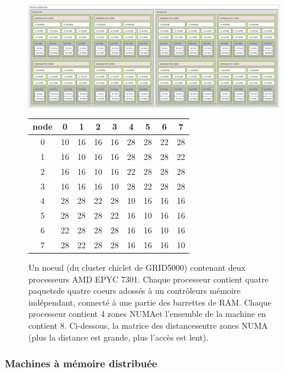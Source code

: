 \begin{figure}
  \centering
  \includegraphics[width=\textwidth]{lstopo_chiclet}
  \caption{Un noeud (du cluster chiclet de GRID5000) contenant deux processeurs
    AMD EPYC 7301. Chaque processeur contient quatre \og paquets\fg de quatre
    coeurs adossés à un contrôleurs mémoire indépendant, connecté à une partie
    des barrettes de RAM. Chaque processeur contient 4 \og zones NUMA\fg et
    l'ensemble de la machine en contient 8. Ci-dessous, la matrice des \og
    distances\fg entre zones NUMA (plus la distance est grande, plus l'accès est
    lent). \label{fig:chiclet}}

\medskip
  
\begin{tabular}{|c||c|c|c|c|c|c|c|c|}  
  \hline
  node &  0 &  1 &  2 &  3 &  4 &  5 &  6 &  7 \\
  \hline\hline
  0 &  10 & 16 & 16 & 16 & 28 & 28 & 22 & 28 \\
  \hline
  1 &  16 & 10 & 16 & 16 & 28 & 28 & 28 & 22 \\
    \hline
  2 &  16 & 16 & 10 & 16 & 22 & 28 & 28 & 28 \\
    \hline
  3 &  16 & 16 & 16 & 10 & 28 & 22 & 28 & 28 \\
    \hline
  4 &  28 & 28 & 22 & 28 & 10 & 16 & 16 & 16 \\
    \hline
  5 &  28 & 28 & 28 & 22 & 16 & 10 & 16 & 16 \\
    \hline
  6 &  22 & 28 & 28 & 28 & 16 & 16 & 10 & 16 \\
    \hline
  7 &  28 & 22 & 28 & 28 & 16 & 16 & 16 & 10 \\
  \hline
\end{tabular}
\end{figure}

\subsubsection{Machines à mémoire distribuée}

